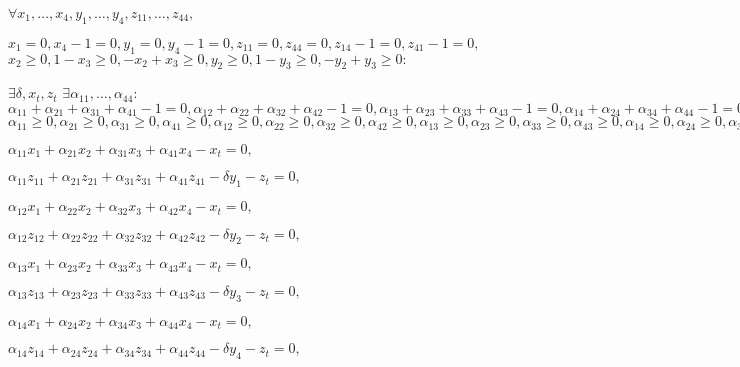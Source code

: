 \documentclass{article}
\begin{document}
$\forall x_1,\dots, x_4, y_1,\dots,y_4, z_{11},\dots,z_{44},$

$x_{1} = 0, x_{4} - 1 = 0, y_{1} = 0, y_{4} - 1 = 0, z_{11} = 0, z_{44} = 0, z_{14} - 1 = 0, z_{41} - 1 = 0,$
$x_{2} \geq 0, 1 - x_{3} \geq 0, - x_{2} + x_{3} \geq 0, y_{2} \geq 0, 1 - y_{3} \geq 0, - y_{2} + y_{3} \geq 0:$

$\exists \delta, x_t, z_t$
$\exists \alpha_{11},\dots,\alpha_{44}:$
$\alpha_{11} + \alpha_{21} + \alpha_{31} + \alpha_{41} - 1 = 0, \alpha_{12} + \alpha_{22} + \alpha_{32} + \alpha_{42} - 1 = 0, \alpha_{13} + \alpha_{23} + \alpha_{33} + \alpha_{43} - 1 = 0, \alpha_{14} + \alpha_{24} + \alpha_{34} + \alpha_{44} - 1 = 0,$
$\alpha_{11} \geq 0, \alpha_{21} \geq 0, \alpha_{31} \geq 0, \alpha_{41} \geq 0, \alpha_{12} \geq 0, \alpha_{22} \geq 0, \alpha_{32} \geq 0, \alpha_{42} \geq 0, \alpha_{13} \geq 0, \alpha_{23} \geq 0, \alpha_{33} \geq 0, \alpha_{43} \geq 0, \alpha_{14} \geq 0, \alpha_{24} \geq 0, \alpha_{34} \geq 0, \alpha_{44} \geq 0,$

$\alpha_{11} x_{1} + \alpha_{21} x_{2} + \alpha_{31} x_{3} + \alpha_{41} x_{4} - x_{t} = 0,$

$\alpha_{11} z_{11} + \alpha_{21} z_{21} + \alpha_{31} z_{31} + \alpha_{41} z_{41} - \delta y_{1} - z_{t} = 0,$

$\alpha_{12} x_{1} + \alpha_{22} x_{2} + \alpha_{32} x_{3} + \alpha_{42} x_{4} - x_{t} = 0,$

$\alpha_{12} z_{12} + \alpha_{22} z_{22} + \alpha_{32} z_{32} + \alpha_{42} z_{42} - \delta y_{2} - z_{t} = 0,$

$\alpha_{13} x_{1} + \alpha_{23} x_{2} + \alpha_{33} x_{3} + \alpha_{43} x_{4} - x_{t} = 0,$

$\alpha_{13} z_{13} + \alpha_{23} z_{23} + \alpha_{33} z_{33} + \alpha_{43} z_{43} - \delta y_{3} - z_{t} = 0,$

$\alpha_{14} x_{1} + \alpha_{24} x_{2} + \alpha_{34} x_{3} + \alpha_{44} x_{4} - x_{t} = 0,$

$\alpha_{14} z_{14} + \alpha_{24} z_{24} + \alpha_{34} z_{34} + \alpha_{44} z_{44} - \delta y_{4} - z_{t} = 0,$
\end{document}
